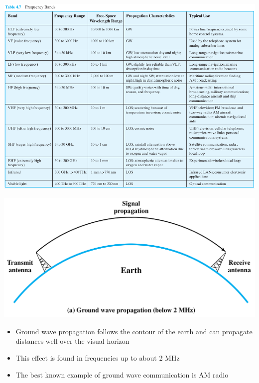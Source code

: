 \documentclass[pdflatex,compress]{beamer}
\begin{document}
\begin{frame}
	\begin{center}
		\includegraphics[height=0.8\textheight]{img/img22}
	\end{center}
\end{frame}

\begin{frame}
	\begin{center}
		\includegraphics[height=0.4\textheight]{img/img23}
	\end{center}
	\begin{itemize}
		\item Ground wave propagation follows the contour of the earth and can propagate distances well over the visual horizon
		\item This effect is found in frequencies up to about 2 MHz
		\item The best known example of ground wave communication is AM radio
	\end{itemize}
\end{frame}
\end{document}
